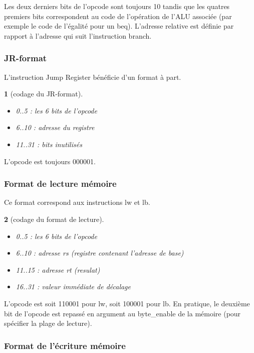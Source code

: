 \documentclass[13pt]{article}
\newtheorem{format}{  }
\begin{document}
Les deux derniers bits de l'opcode sont toujours 10 tandis que
les quatres premiers bits correspondent au code de l'opération de 
l'ALU associée (par exemple le code de l'égalité pour un beq).
L'adresse relative est définie par rapport à l'adresse qui suit 
l'instruction branch.


\subsubsection{JR-format}

L'instruction Jump Register bénéficie d'un format à part.

\begin{format}[codage du JR-format]
  \begin{itemize}
  \item 0..5 : les 6 bits de l'opcode
  \item 6..10 : adresse du registre
  \item 11..31 : bits inutilisés
  \end{itemize}
\end{format}

L'opcode est toujours 000001.


\subsubsection{Format de lecture mémoire}

Ce format correspond aux instructions lw et lb.

\begin{format}[codage du format de lecture]
  \begin{itemize}
  \item 0..5 : les 6 bits de l'opcode
  \item 6..10 : adresse rs (registre contenant l'adresse de base) 
  \item 11..15 : adresse rt (resulat)
  \item 16..31 : valeur immédiate de décalage
  \end{itemize}
\end{format}

L'opcode est soit 110001 pour lw, soit 100001 pour lb. En pratique, 
le deuxième bit de l'opcode est repassé en argument au byte\_enable
de la mémoire (pour spécifier la plage de lecture).
 
\subsubsection{Format de l'écriture mémoire}
\end{document}
